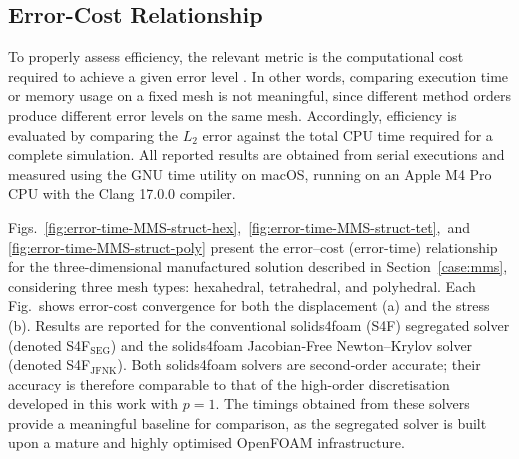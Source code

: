 \documentclass[sn-mathphys,Numbered]{sn-jnl}%
\begin{document}
\subsection{Error-Cost Relationship}
%
To properly assess efficiency, the relevant metric is the computational cost required to achieve a given error level \cite{wang2013}. 
In other words, comparing execution time or memory usage on a fixed mesh is not meaningful, since different method orders produce different error levels on the same mesh. Accordingly, efficiency is evaluated by comparing the $L_2$ error against the total CPU time required for a complete simulation.
All reported results are obtained from serial executions and measured using the GNU time utility on macOS, running on an Apple M4 Pro CPU with the Clang 17.0.0 compiler.


Figs.~\ref{fig:error-time-MMS-struct-hex},~\ref{fig:error-time-MMS-struct-tet},~and \ref{fig:error-time-MMS-struct-poly} present the error–cost (error-time) relationship for the three-dimensional manufactured solution described in Section~\ref{case:mms}, considering three mesh types: hexahedral, tetrahedral, and polyhedral. 
Each Fig.~shows error-cost convergence for both the displacement (a) and the stress (b). Results are reported for the conventional solids4foam (S4F) segregated solver (denoted 
S4F$_{\text{SEG}}$) and the solids4foam Jacobian-Free Newton–Krylov solver (denoted S4F$_{\text{JFNK}}$). Both solids4foam solvers are second-order accurate; their accuracy is therefore comparable to that of the high-order discretisation developed in this work with $p=1$. The timings obtained from these solvers provide a meaningful baseline for comparison, as the segregated solver is built upon a mature and highly optimised OpenFOAM infrastructure.
\end{document}
